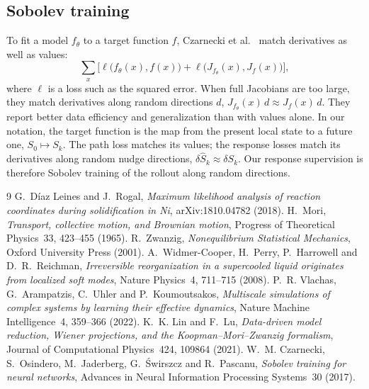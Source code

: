 \documentclass[11pt,a4paper]{article}
\numberwithin{equation}{section}
\begin{document}
\subsection{Sobolev training}

To fit a model $f_\theta$ to a target function $f$, Czarnecki et
al.~\cite{sobolev} match derivatives as well as values:
\begin{equation}
\sum_x\Big[\ell\big(f_\theta(x),f(x)\big)+\ell\big(J_{f_\theta}(x),J_f(x)\big)\Big],
\end{equation}
where $\ell$ is a loss such as the squared error. When full Jacobians are too large,
they match derivatives along random directions $d$, $J_{f_\theta}(x)\,d\approx J_f(x)\,d$.
They report better data efficiency and generalization than with values alone. In
our notation, the target function is the map from the present local state to a
future one, $S_0\mapsto S_k$. The path loss matches its values; the response losses
match its derivatives along random nudge directions, $\delta\widehat S_k\approx\delta S_k$.
Our response supervision is therefore Sobolev training of the rollout along random
directions.

\begin{thebibliography}{9}
 G.~D\'iaz Leines and J.~Rogal, \emph{Maximum likelihood analysis of
  reaction coordinates during solidification in Ni}, arXiv:1810.04782 (2018).
 H.~Mori, \emph{Transport, collective motion, and Brownian motion}, Progress of
  Theoretical Physics~33, 423--455 (1965).
 R.~Zwanzig, \emph{Nonequilibrium Statistical Mechanics}, Oxford University
  Press (2001).
 A.~Widmer-Cooper, H.~Perry, P.~Harrowell and D.~R.~Reichman,
  \emph{Irreversible reorganization in a supercooled liquid originates from localized soft
  modes}, Nature Physics~4, 711--715 (2008).
 P.~R. Vlachas, G.~Arampatzis, C.~Uhler and P.~Koumoutsakos, \emph{Multiscale
  simulations of complex systems by learning their effective dynamics}, Nature Machine
  Intelligence~4, 359--366 (2022).
 K.~K. Lin and F.~Lu, \emph{Data-driven model reduction, Wiener projections, and
  the Koopman--Mori--Zwanzig formalism}, Journal of Computational Physics~424, 109864 (2021).
 W.~M. Czarnecki, S.~Osindero, M.~Jaderberg, G.~\'Swirszcz and R.~Pascanu,
  \emph{Sobolev training for neural networks}, Advances in Neural Information Processing
  Systems~30 (2017).
\end{thebibliography}
\end{document}
